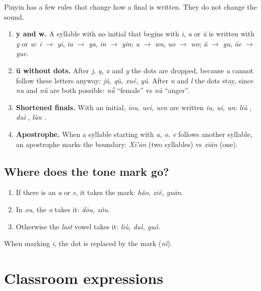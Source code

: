 Pinyin has a few rules that change how a final is written. They do not change the sound.

\begin{important}
\begin{enumerate}
  \item \textbf{y and w.} A syllable with no initial that begins with \emph{i}, \emph{u}
        or \emph{ü} is written with \emph{y} or \emph{w}: \emph{i} $\rightarrow$ \emph{yi},
        \emph{ia} $\rightarrow$ \emph{ya}, \emph{in} $\rightarrow$ \emph{yin};
        \emph{u} $\rightarrow$ \emph{wu}, \emph{uo} $\rightarrow$ \emph{wo};
        \emph{ü} $\rightarrow$ \emph{yu}, \emph{üe} $\rightarrow$ \emph{yue}.
  \item \textbf{ü without dots.} After \emph{j, q, x} and \emph{y} the dots are dropped,
        because \emph{u} cannot follow these letters anyway: \emph{jù, qù, xué, yú}. After
        \emph{n} and \emph{l} the dots stay, since \emph{nu} and \emph{nü} are both
        possible: \emph{nǚ}  ``female'' vs \emph{nù}  ``anger''.
  \item \textbf{Shortened finals.} With an initial, \emph{iou, uei, uen} are written
        \emph{iu, ui, un}: \emph{liù} , \emph{duì} , \emph{lùn} .
  \item \textbf{Apostrophe.} When a syllable starting with \emph{a, o, e} follows another
        syllable, an apostrophe marks the boundary: \emph{Xī'ān}  (two syllables)
        vs \emph{xiān}  (one).
\end{enumerate}
\end{important}

\subsection{Where does the tone mark go?}

\begin{enumerate}
  \item If there is an \emph{a} or \emph{e}, it takes the mark: \emph{hǎo, xiè, guān}.
  \item In \emph{ou}, the \emph{o} takes it: \emph{dōu, zǒu}.
  \item Otherwise the \emph{last} vowel takes it: \emph{liù, duì, guó}.
\end{enumerate}
When marking \emph{i}, the dot is replaced by the mark (\emph{nǐ}).

\section{Classroom expressions}

